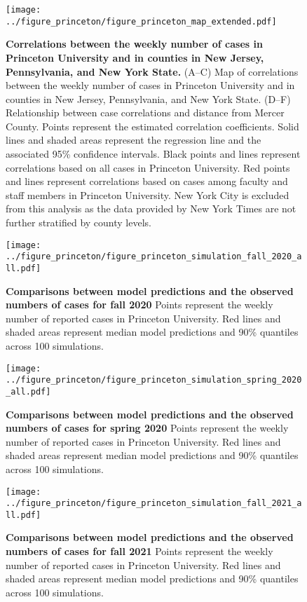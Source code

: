 \documentclass[12pt]{article}
\begin{document}
\pagebreak

\begin{figure}[!htp]
\texttt{[image: ../figure\_princeton/figure\_princeton\_map\_extended.pdf]}
\caption{
\textbf{Correlations between the weekly number of cases in Princeton University and in counties in New Jersey, Pennsylvania, and New York State.}
(A--C) Map of correlations between the weekly number of cases in Princeton University and in counties in New Jersey, Pennsylvania, and New York State.
(D--F) Relationship between case correlations and distance from Mercer County.
Points represent the estimated correlation coefficients.
Solid lines and shaded areas represent the regression line and the associated 95\% confidence intervals.
Black points and lines represent correlations based on all cases in Princeton University.
Red points and lines represent correlations based on cases among faculty and staff members in Princeton University.
New York City is excluded from this analysis as the data provided by New York Times are not further stratified by county levels.
}
\end{figure}

\pagebreak

\begin{figure}[!htp]
\texttt{[image: ../figure\_princeton/figure\_princeton\_simulation\_fall\_2020\_all.pdf]}
\caption{
\textbf{Comparisons between model predictions and the observed numbers of cases for fall 2020}
Points represent the weekly number of reported cases in Princeton University.
Red lines and shaded areas represent median model predictions and 90\% quantiles across 100 simulations.
}
\end{figure}

\pagebreak

\begin{figure}[!htp]
\texttt{[image: ../figure\_princeton/figure\_princeton\_simulation\_spring\_2020\_all.pdf]}
\caption{
\textbf{Comparisons between model predictions and the observed numbers of cases for spring 2020}
Points represent the weekly number of reported cases in Princeton University.
Red lines and shaded areas represent median model predictions and 90\% quantiles across 100 simulations.
}
\end{figure}


\pagebreak

\begin{figure}[!htp]
\texttt{[image: ../figure\_princeton/figure\_princeton\_simulation\_fall\_2021\_all.pdf]}
\caption{
\textbf{Comparisons between model predictions and the observed numbers of cases for fall 2021}
Points represent the weekly number of reported cases in Princeton University.
Red lines and shaded areas represent median model predictions and 90\% quantiles across 100 simulations.
}
\end{figure}
\end{document}
